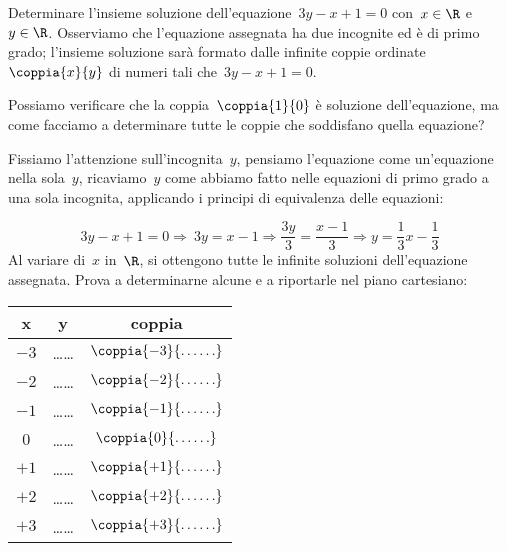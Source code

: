  \begin{esempio}{}{}
Determinare l'insieme soluzione dell'equazione~\(3y-x+1=0\) con~\(x\in\R\) 
e~\(y\in\R\).
Osserviamo che l'equazione assegnata ha due incognite ed
è di primo grado; l'insieme soluzione sarà formato
dalle infinite coppie ordinate~\(\coppia{x}{y}\) di numeri tali 
che~\(3y-x+1=0\).

Possiamo verificare che la coppia~\(\coppia{1}{0}\) è soluzione
dell'equazione, ma come facciamo a determinare tutte le
coppie che soddisfano quella equazione?

Fissiamo l'attenzione sull'incognita~\(y\),
pensiamo l'equazione come un'equazione
nella sola~\(y\), ricaviamo~\(y\) come abbiamo fatto nelle equazioni di 
primo grado a una sola incognita, applicando i principi di equivalenza 
delle equazioni:

\begin{equation*}
3y-x+1=0\Rightarrow~3y=x-1\Rightarrow\frac{3y}{3}=\frac{x-1}{3}\Rightarrow 
y=\frac{1}{3}x-\frac{1}{3}
\end{equation*}
Al variare di~\(x\) in~\(\R\), si ottengono tutte le infinite
soluzioni dell'equazione assegnata.
Prova a determinarne alcune e a riportarle nel piano cartesiano:

\begin{minipage}{.48\textwidth}
\begin{center}
 \begin{tabular}{ccc}
\toprule
x & y & coppia\\
\midrule
\(-3\) & \ldots\ldots & \(\coppia{-3}{\ldots\ldots}\)\\
\(-2\) & \ldots\ldots & \(\coppia{-2}{\ldots\ldots}\)\\
\(-1\) & \ldots\ldots & \(\coppia{-1}{\ldots\ldots}\)\\
\(0\) & \ldots\ldots & \(\coppia{0}{\ldots\ldots}\)\\
\(+1\) & \ldots\ldots & \(\coppia{+1}{\ldots\ldots}\)\\
\(+2\) & \ldots\ldots & \(\coppia{+2}{\ldots\ldots}\)\\
\(+3\) & \ldots\ldots & \(\coppia{+3}{\ldots\ldots}\)\\
\bottomrule
\end{tabular}
\end{center}
\end{minipage}
\hfill
\begin{minipage}{.48\textwidth}
%  
\end{minipage}


\end{esempio}
